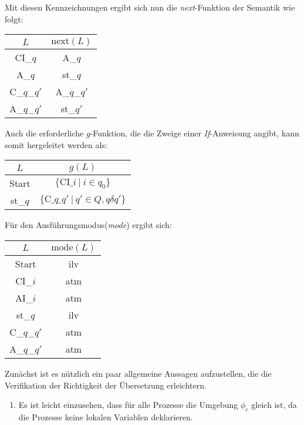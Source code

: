 Mit diesen Kennzeichnungen ergibt sich nun die \emph{next}-Funktion der Semantik wie folgt:

\begin{tabular}{|c|c|}
  \hline
  $L$ & $\textrm{next}(L)$\\
  \hline
  CI\_$q$ & A\_$q$\\
  A\_$q$ & st\_$q$\\
  C\_$q$\_$q'$ & A\_$q$\_$q'$\\
  A\_$q$\_$q'$ & st\_$q'$\\
  \hline
\end{tabular}

Auch die erforderliche $g$-Funktion, die die Zweige einer \emph{If}-Anweisung angibt, kann somit hergeleitet werden als:

\begin{tabular}{|c|c|}
  \hline
  $L$ & $g(L)$\\
  \hline
  Start & $\{ \textrm{CI\_}i\ |\ i\in q_0 \}$\\
  st\_$q$ & $\{ \textrm{C\_}q\textrm{\_}q'\ |\ q'\in Q, q\delta q' \}$\\
  \hline
\end{tabular}

Für den Ausführungsmodus(\emph{mode}) ergibt sich:

\begin{tabular}{|c|c|}
  \hline
  $L$ & $\textrm{mode}(L)$\\
  \hline
  Start & ilv\\
  CI\_$i$ & atm\\
  AI\_$i$ & atm\\
  st\_$q$ & ilv\\
  C\_$q$\_$q'$ & atm\\
  A\_$q$\_$q'$ & atm\\
  \hline
\end{tabular}

Zunächst ist es nützlich ein paar allgemeine Aussagen aufzustellen, die die Verifikation der Richtigkeit der Übersetzung erleichtern.
\begin{enumerate}
\item Es ist leicht einzusehen, dass für alle Prozesse die Umgebung $\phi_e$ gleich ist, da die Prozesse keine lokalen Variablen deklarieren.
\end{enumerate}

